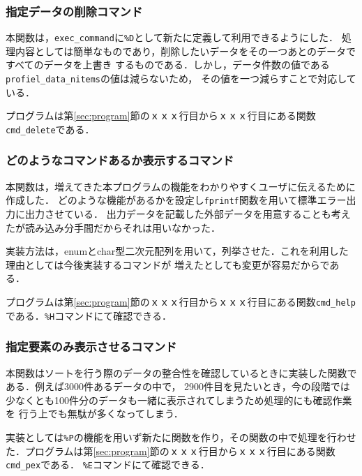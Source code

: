 \documentclass[a4j,11pt]{jarticle}
\begin{document}
\subsubsection{指定データの削除コマンド}\label{sec:sakujyo}
本関数は，\verb|exec_command|に\verb|%D|として新たに定義して利用できるようにした．
処理内容としては簡単なものであり，削除したいデータをその一つあとのデータですべてのデータを上書き
するものである．しかし，データ件数の値である\verb|profiel_data_nitems|の値は減らないため，
その値を一つ減らすことで対応している．

プログラムは第\ref{sec:program}節のｘｘｘ行目からｘｘｘ行目にある関数\verb|cmd_delete|である．
\subsubsection{どのようなコマンドあるか表示するコマンド}\label{sec:help}
本関数は，増えてきた本プログラムの機能をわかりやすくユーザに伝えるために作成した．
どのような機能があるかを設定し\verb|fprintf|関数を用いて標準エラー出力に出力させている．
出力データを記載した外部データを用意することも考えたが読み込み分手間だからそれは用いなかった．

実装方法は，enumとchar型二次元配列を用いて，列挙させた．これを利用した理由としては今後実装するコマンドが
増えたとしても変更が容易だからである．

プログラムは第\ref{sec:program}節のｘｘｘ行目からｘｘｘ行目にある関数\verb|cmd_help|である．\verb|%H|コマンドにて確認できる．
\subsubsection{指定要素のみ表示させるコマンド}\label{sec:printyouso}
本関数はソートを行う際のデータの整合性を確認しているときに実装した関数である．例えば3000件あるデータの中で，
2900件目を見たいとき，今の段階では少なくとも100件分のデータも一緒に表示されてしまうため処理的にも確認作業を
行う上でも無駄が多くなってしまう．

実装としては\verb|%P|の機能を用いず新たに関数を作り，その関数の中で処理を行わせた．プログラムは第\ref{sec:program}節のｘｘｘ行目からｘｘｘ行目にある関数\verb|cmd_pex|である．
\verb|%E|コマンドにて確認できる．
\end{document}

